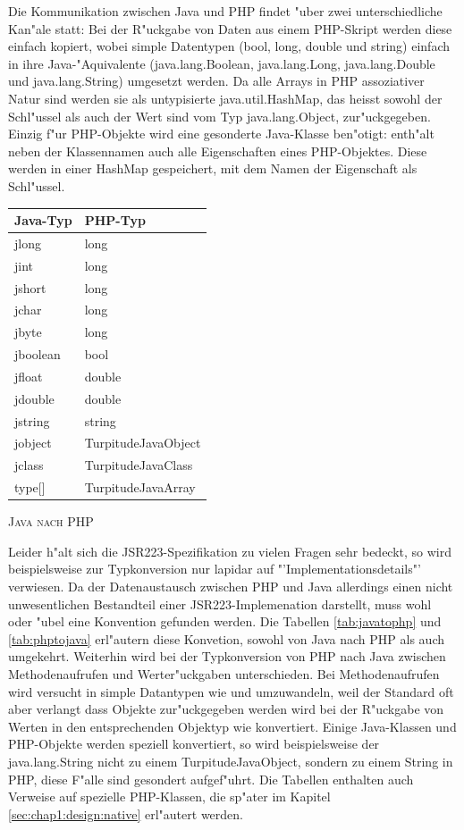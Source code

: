 Die Kommunikation zwischen Java und PHP findet "uber zwei unterschiedliche Kan"ale statt:
Bei der R"uckgabe von Daten aus einem PHP-Skript werden diese einfach kopiert, wobei simple Datentypen (bool, long, double und string)
einfach in ihre Java-"Aquivalente (java.lang.Boolean, java.lang.Long, java.lang.Double und java.lang.String) umgesetzt werden.
Da alle Arrays in PHP assoziativer Natur sind werden sie als untypisierte java.util.HashMap, das heisst sowohl der Schl"ussel als auch der Wert
sind vom Typ java.lang.Object, zur"uckgegeben. Einzig f"ur PHP-Objekte wird eine gesonderte Java-Klasse ben"otigt:  enth"alt neben
der Klassennamen auch alle Eigenschaften eines PHP-Objektes. Diese werden in einer HashMap gespeichert, mit dem Namen der Eigenschaft
als Schl"ussel.
\begin{floatingtable}{
\label{tab:javatophp}
\begin{tabular}{|l|l|}
\hline
Java-Typ & PHP-Typ\\
\hline\hline
jlong & long\\
jint & long\\
jshort & long\\
jchar & long\\
jbyte & long\\
jboolean & bool\\
jfloat & double\\
jdouble & double\\
jstring & string\\
jobject & TurpitudeJavaObject\\
jclass & TurpitudeJavaClass\\
type[] & TurpitudeJavaArray\\
\hline
\end{tabular}}
\caption{\textsc{Java nach PHP}}
\end{floatingtable}
Leider h"alt sich die JSR223-Spezifikation zu vielen Fragen sehr bedeckt, so wird beispielsweise zur Typkonversion nur lapidar auf 
"'Implementationsdetails"' verwiesen. Da der Datenaustausch zwischen PHP und Java allerdings einen nicht unwesentlichen Bestandteil
einer JSR223-Implemenation darstellt, muss wohl oder "ubel eine Konvention gefunden werden. Die Tabellen \ref{tab:javatophp} und \ref{tab:phptojava}
erl"autern diese Konvetion, sowohl von Java nach PHP als auch umgekehrt. Weiterhin wird bei der Typkonversion von PHP nach Java zwischen 
Methodenaufrufen und Werter"uckgaben unterschieden. Bei Methodenaufrufen wird versucht in simple Datantypen wie  und 
umzuwandeln, weil der Standard oft aber verlangt dass Objekte zur"uckgegeben werden wird bei der R"uckgabe von Werten in den entsprechenden
Objektyp wie  konvertiert. Einige Java-Klassen und PHP-Objekte werden speziell konvertiert, so wird beispielsweise
der java.lang.String nicht zu einem TurpitudeJavaObject, sondern zu einem String in PHP, diese F"alle sind gesondert aufgef"uhrt. Die
Tabellen enthalten auch Verweise auf spezielle PHP-Klassen, die sp"ater im Kapitel \ref{sec:chap1:design:native} erl"autert werden.

